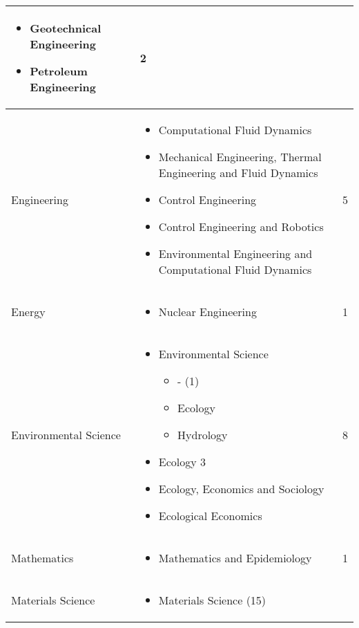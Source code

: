 \documentclass[utf8]{gradu3}
\begin{document}
\begin{longtable}[h]{|p{5cm}|p{8cm}|p{1cm}|}
\begin{itemize} [nosep]
            \item Geotechnical Engineering
            \item Petroleum Engineering
        \end{itemize} & 2 \\
    \hline
    Engineering & 
     \begin{itemize}[nosep]
        \item Computational Fluid Dynamics
        \item Mechanical Engineering, Thermal Engineering and Fluid Dynamics
        \item Control Engineering
        \item Control Engineering and Robotics
        \item Environmental Engineering and Computational Fluid Dynamics
    \end{itemize}& 5 \\
     \hline 
     Energy & \begin{itemize}[nosep]
         \item Nuclear Engineering
     \end{itemize} & 1 \\
     \hline
     Environmental Science & 
     \begin{itemize}[nosep]
        \item Environmental Science
        \begin{itemize}[nosep]
            \item - (1)
            \item Ecology
            \item Hydrology
        \end{itemize}
        \item Ecology 3
        \item Ecology, Economics and Sociology
        \item Ecological Economics 
    \end{itemize} & 8 \\
     \hline
     Mathematics & \begin{itemize}[nosep]
         \item Mathematics and Epidemiology
     \end{itemize} & 1 \\
     \hline
     Materials Science & 
     \begin{itemize}[noitemsep,nolistsep]
    \item Materials Science (15)
        \begin{itemize}

\end{itemize}
\end{itemize}
\end{longtable}
\end{document}
